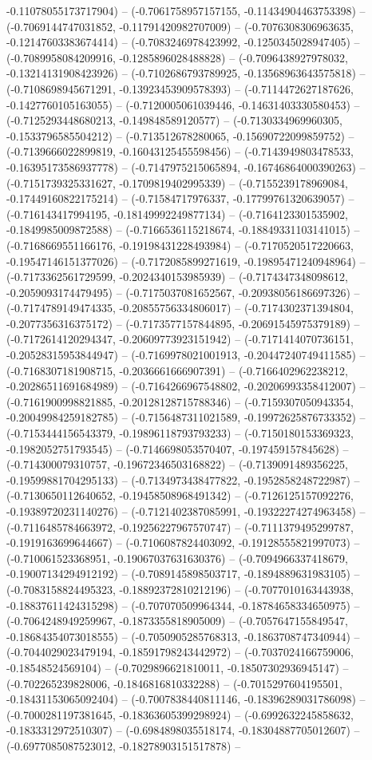 -0.11078055173717904) -- (-0.7061758957157155, -0.11434904463753398) -- (-0.7069144747031852, -0.11791420982707009) -- (-0.7076308306963635, -0.12147603383674414) -- (-0.7083246978423992, -0.1250345028947405) -- (-0.7089958084209916, -0.1285896028488828) -- (-0.7096438927978032, -0.13214131908423926) -- (-0.7102686793789925, -0.13568963643575818) -- (-0.7108698945671291, -0.13923453909578393) -- (-0.7114472627187626, -0.1427760105163055) -- (-0.7120005061039446, -0.14631403330580453) -- (-0.7125293448680213, -0.149848589120577) -- (-0.7130334969960305, -0.1533796585504212) -- (-0.713512678280065, -0.15690722099859752) -- (-0.7139666022899819, -0.16043125455598456) -- (-0.7143949803478533, -0.16395173586937778) -- (-0.7147975215065894, -0.16746864000390263) -- (-0.7151739325331627, -0.1709819402995339) -- (-0.7155239178969084, -0.17449160822175214) -- (-0.71584717976337, -0.17799761320639057) -- (-0.716143417994195, -0.18149992249877134) -- (-0.7164123301535902, -0.1849985009872588) -- (-0.7166536115218674, -0.18849331103141015) -- (-0.7168669551166176, -0.19198431228493984) -- (-0.7170520517220663, -0.19547146151377026) -- (-0.7172085899271619, -0.19895471240948964) -- (-0.7173362561729599, -0.2024340153985939) -- (-0.7174347348098612, -0.2059093174479495) -- (-0.7175037081652567, -0.20938056186697326) -- (-0.7174789149474335, -0.20855756334806017) -- (-0.7174302371394804, -0.2077356316375172) -- (-0.7173577157844895, -0.20691545975379189) -- (-0.7172614120294347, -0.20609773923151942) -- (-0.7171414070736151, -0.20528315953844947) -- (-0.7169978021001913, -0.20447240749411585) -- (-0.7168307181908715, -0.2036661666907391) -- (-0.7166402962238212, -0.20286511691684989) -- (-0.7164266967548802, -0.20206993358412007) -- (-0.7161900998821885, -0.20128128715788346) -- (-0.7159307050943354, -0.20049984259182785) -- (-0.7156487311021589, -0.19972625876733352) -- (-0.7153444156543379, -0.19896118793793233) -- (-0.7150180153369323, -0.1982052751793545) -- (-0.7146698053570407, -0.197459157845628) -- (-0.714300079310757, -0.19672346503168822) -- (-0.7139091489356225, -0.19599881704295133) -- (-0.7134973438477822, -0.1952858248722987) -- (-0.7130650112640652, -0.19458508968491342) -- (-0.7126125157092276, -0.19389720231140276) -- (-0.7121402387085991, -0.19322274274963458) -- (-0.7116485784663972, -0.19256227967570747) -- (-0.7111379495299787, -0.1919163699644667) -- (-0.7106087824403092, -0.19128555821997073) -- (-0.710061523368951, -0.19067037631630376) -- (-0.7094966337418679, -0.19007134294912192) -- (-0.7089145898503717, -0.1894889631983105) -- (-0.7083158824495323, -0.18892372810212196) -- (-0.7077010163443938, -0.18837611424315298) -- (-0.707070509964344, -0.18784658334650975) -- (-0.7064248949259967, -0.1873355818905009) -- (-0.7057647155849547, -0.18684354073018555) -- (-0.7050905285768313, -0.1863708747340944) -- (-0.7044029023479194, -0.18591798243442972) -- (-0.7037024166759006, -0.18548524569104) -- (-0.7029896621810011, -0.18507302936945147) -- (-0.702265239828006, -0.1846816810332288) -- (-0.7015297604195501, -0.18431153065092404) -- (-0.7007838440811146, -0.18396289031786098) -- (-0.7000281197381645, -0.18363605399298924) -- (-0.6992632245858632, -0.1833312972510307) -- (-0.6984898035518174, -0.18304887705012607) -- (-0.6977085087523012, -0.18278903151517878) -- 